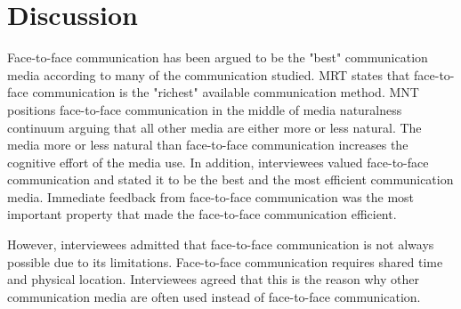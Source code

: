 \documentclass[english,12pt,a4paper,pdftex]{article}
\begin{document}

\clearpage

\section{Discussion}
\label{sec:discussion}
\acresetall

Face-to-face communication has been argued to be the "best" communication media according to many of the communication studied. \ac{MRT} states that face-to-face communication is the "richest" available communication method. \Ac{MNT} positions face-to-face communication in the middle of media naturalness continuum arguing that all other media are either more or less natural. The media more or less natural than face-to-face communication increases the cognitive effort of the media use. In addition, interviewees valued face-to-face communication and stated it to be the best and the most efficient communication media. Immediate feedback from face-to-face communication was the most important property that made the face-to-face communication efficient.

However, interviewees admitted that face-to-face communication is not always possible due to its limitations. Face-to-face communication requires shared time and physical location. Interviewees agreed that this is the reason why other communication media are often used instead of face-to-face communication.
\end{document}
